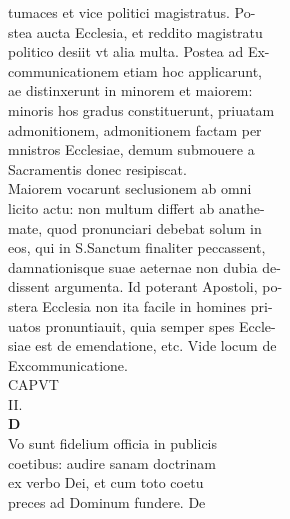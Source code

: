 \documentclass{article}
\begin{document}
\begin{pages}
                tumaces et vice politici magistratus. Po- \\
                stea aucta Ecclesia, et reddito magistratu \\
                politico desiit vt alia multa. Postea ad Ex- \\
                communicationem etiam hoc applicarunt, \\
                ae distinxerunt in minorem et maiorem: \\
                minoris hos gradus constituerunt, priuatam \\
                admonitionem, admonitionem factam per \\
                mnistros Ecclesiae, demum submouere a \\
                Sacramentis donec resipiscat. \\
                Maiorem vocarunt seclusionem ab omni \\
                licito actu: non multum differt ab anathe- \\
                mate, quod pronunciari debebat solum in \\
                eos, qui in S.Sanctum finaliter peccassent, \\
                damnationisque suae aeternae non dubia de- \\
                dissent argumenta. Id poterant Apostoli, po- \\
                stera Ecclesia non ita facile in homines pri- \\
                uatos pronuntiauit, quia semper spes Eccle- \\
                siae est de emendatione, etc. Vide locum de \\
                Excommunicatione. \\
                CAPVT \\
                II. \\
                \textbf{D \\
                }Vo sunt fidelium officia in publicis \\
                coetibus: audire sanam doctrinam \\
                ex verbo Dei, et cum toto coetu \\
                preces ad Dominum fundere. De \\

\end{pages}
\end{document}
